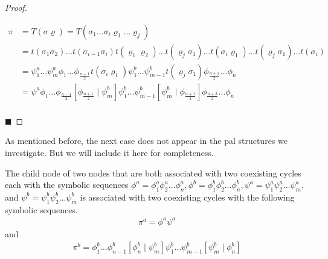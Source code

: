 \begin{proof}
\begin{enumerate}
\begin{align*}
			      \pi & = T(\sigma\varrho) = T(\sigma_1 \dots \sigma_i \varrho_1 \dots \varrho_j)                                                                                             \\
			          & =
			      t(\sigma_1\sigma_2) \dots t(\sigma_{i-1}\sigma_i) t(\varrho_1\varrho_2) \dots t(\varrho_j \sigma_1) \dots t(\sigma_i\varrho_1) \dots t(\varrho_j\sigma_1) \dots t(\sigma_i) \\
			          & =
			      \psi^a_1 \dots \psi^a_m
			      \phi_1 \dots \phi_{\frac{n-1}{2}} t(\sigma_i \varrho_1)
			      \psi^b_1 \dots \psi^b_{m-1} t(\varrho_j \sigma_1)
			      \phi_{\frac{n+3}{2}} \dots \phi_n                                                                                                                                           \\
			          & =
			      \psi^a
			      \phi_1 \dots \phi_{\frac{n-1}{2}} \left[\phi_{\frac{n+1}{2}} \mid \psi^b_m\right]
			      \psi^b_1 \dots \psi^b_{m-1} \left[\psi^b_m \mid \phi_{\frac{n+1}{2}}\right]
			      \phi_{\frac{n+3}{2}} \dots \phi_n                                                                                                                                           \\
		      \end{align*}
	\end{enumerate}
	\hfill $\blacksquare$
\end{proof}

As mentioned before, the next case does not appear in the \gls{pal} structures we investigate.
But we will include it here for completeness.

\begin{theorem}
	\label{theorem:child.symbolic.3}
	The child node of two nodes that are both associated with two coexisting cycles each with the symbolic sequences $\phi^a = \phi^a_1\phi^a_2\dots\phi^a_n, \phi^b = \phi^b_1\phi^b_2\dots\phi^b_n, \psi^a = \psi^a_1\psi^a_2\dots\psi^a_m,$ and $\psi^b = \psi^b_1\psi^b_2\dots\psi^b_m$ is associated with two coexisting cycles with the following symbolic sequences.
	\begin{align}
		\pi^a = \phi^a\psi^a
	\end{align}
	and
	\begin{align}
		\pi^b = \phi^b_1 \dots \phi^b_{n-1} \left[\phi^b_n \mid \psi^b_m\right] \psi^b_1 \dots \psi^b_{m-1} \left[\psi^b_m \mid \phi^b_n\right]
	\end{align}
\end{theorem}

